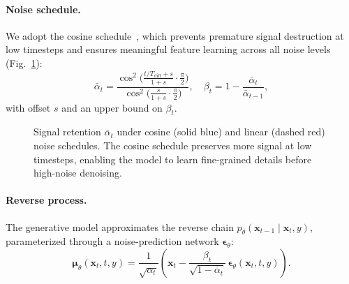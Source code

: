 \documentclass{ieeeaccess}
\begin{document}
\paragraph{Noise schedule.} We adopt the cosine schedule~\cite{nichol2021improved}, which prevents premature signal destruction at low timesteps and ensures meaningful feature learning across all noise levels (Fig.~\ref{fig:noise_schedule}):
\begin{equation}
    \bar{\alpha}_t = \frac{\cos^2\!\bigl(\tfrac{t/T_\mathrm{diff}+s}{1+s} \cdot \tfrac{\pi}{2}\bigr)}{\cos^2\!\bigl(\tfrac{s}{1+s} \cdot \tfrac{\pi}{2}\bigr)},\quad \beta_t = 1 - \frac{\bar{\alpha}_t}{\bar{\alpha}_{t-1}},
\end{equation}
with offset $s$ and an upper bound on $\beta_t$.

\begin{figure}[H]
    \centering
    \caption{Signal retention $\bar{\alpha}_t$ under cosine (solid blue) and linear (dashed red) noise schedules. The cosine schedule preserves more signal at low timesteps, enabling the model to learn fine-grained details before high-noise denoising.}
    \label{fig:noise_schedule}
\end{figure}

\paragraph{Reverse process.} The generative model approximates the reverse chain $p_\theta(\mathbf{x}_{t-1} \mid \mathbf{x}_t, y)$, parameterized through a noise-prediction network $\boldsymbol{\epsilon}_\theta$:
\begin{equation}
    \boldsymbol{\mu}_\theta(\mathbf{x}_t, t, y) = \frac{1}{\sqrt{\alpha_t}} \left(\mathbf{x}_t - \frac{\beta_t}{\sqrt{1-\bar{\alpha}_t}}\,\boldsymbol{\epsilon}_\theta(\mathbf{x}_t, t, y)\right).
\end{equation}
\end{document}
